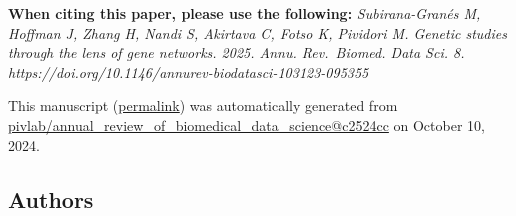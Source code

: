 { \textbf{When citing this paper, please use the following:}
\emph{Subirana-Granés M, Hoffman J, Zhang H, Nandi S, Akirtava C, Fotso K, Pividori M. Genetic studies through the lens of gene networks. 2025. Annu. Rev.~Biomed. Data Sci. 8. https://doi.org/10.1146/annurev-biodatasci-103123-095355}}

This manuscript
(\href{https://pivlab.github.io/annual_review_of_biomedical_data_science/v/c2524cc88cbe2714df69644fdc4b9d3d5105b835/}{permalink})
was automatically generated
from \href{https://github.com/pivlab/annual_review_of_biomedical_data_science/tree/c2524cc88cbe2714df69644fdc4b9d3d5105b835}{pivlab/annual\_review\_of\_biomedical\_data\_science@c2524cc}
on October 10, 2024.

\hypertarget{authors}{%
\subsection{Authors}\label{authors}}


